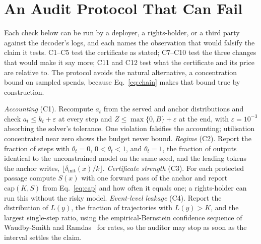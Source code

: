 \section{An Audit Protocol That Can Fail}\label{sec:protocol}

Each check below can be run by a deployer, a rights-holder, or a third party against the decoder's logs, and each names the observation that would falsify the claim it tests. C1--C5 test the certificate as stated; C7--C10 test the three changes that would make it say more; C11 and C12 test what the certificate and its price are relative to. The protocol avoids the natural alternative, a concentration bound on sampled spends, because Eq.~\eqref{eq:chain} makes that bound true by construction.

\emph{Accounting} (C1). Recompute $a_t$ from the served and anchor distributions and check $a_t \le k_t + \varepsilon$ at every step and $Z \le \max\{0,B\} + \varepsilon$ at the end, with $\varepsilon = 10^{-3}$ absorbing the solver's tolerance. One violation falsifies the accounting; utilisation concentrated near zero shows the budget never bound. \emph{Regime} (C2). Report the fraction of steps with $\theta_t = 0$, $0 < \theta_t < 1$, and $\theta_t = 1$, the fraction of outputs identical to the unconstrained model on the same seed, and the leading tokens the anchor writes, $\lfloor \delta_{\mathrm{init}}(x)/k \rfloor$. \emph{Certificate strength} (C3). For each protected passage compute $S(x)$ with one forward pass of the anchor and report $\mathrm{cap}(K,S)$ from Eq.~\eqref{eq:cap} and how often it equals one; a rights-holder can run this without the risky model. \emph{Event-level leakage} (C4). Report the distribution of $L(y)$, the fraction of trajectories with $L(y) > K$, and the largest single-step ratio, using the empirical-Bernstein confidence sequence of Waudby-Smith and Ramdas~\cite{waudbysmith2024estimating} for rates, so the auditor may stop as soon as the interval settles the claim.

